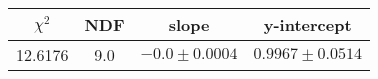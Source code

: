 \begin{tabular}{|c|c|c|c|}

\hline
$\chi^{2}$ & NDF & slope & y-intercept  \\
\hline
12.6176 & 9.0 & $-0.0\pm0.0004$ & $0.9967\pm0.0514$ \\
\hline

\end{tabular}